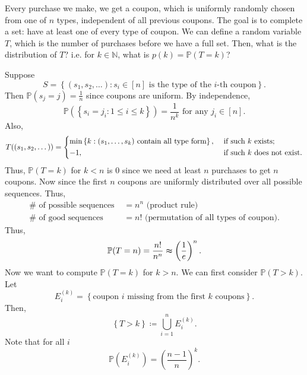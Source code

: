 \begin{eg}
    Every purchase we make, we get a coupon, which is uniformly randomly chosen from one of \(n\) types, independent of all previous coupons. The goal is to complete a set: have at least one of every type of coupon. We can define a random variable \(T\), which is the number of purchases before we have a full set. Then, what is the distribution of \(T\)? i.e. for \(k \in \mathbb{N} \), what is \(p(k) = \mathbb{P} (T = k)\)?    
\end{eg}

\begin{explanation}
    Suppose 
    \[
        S = \left\{ (s_1, s_2, \dots) : s_i \in [n] \text{ is the type of the } i\text{-th coupon}  \right\}. 
    \]
    Then \(\mathbb{P} (s_j = j) = \frac{1}{n}\) since coupons are uniform. By independence, 
    \[
        \mathbb{P} (\left\{ s_i = j_i : 1 \le i \le k \right\} ) = \frac{1}{n^k} \text{ for any } j_i \in [n]. 
    \] 
    Also,
    \[
        T((s_1, s_2, \dots )) = \begin{dcases}
            \min \left\{ k: (s_1, \dots , s_k) \text{ contain all type form}  \right\} , &\text{ if such } k \text{ exists};\\
            -1, &\text{ if such } k \text{ does not exist}.
        \end{dcases}
    \]
    Thus, \(\mathbb{P} (T = k)\) for \(k < n\) is \(0\) since we need at least \(n\) purchases to get \(n\) coupons. Now since the first \(n\) coupons are uniformly distributed over all possible sequences. Thus, 
    \begin{align*}
        \# \text{ of possible sequences } &= n^n \text{ (product rule)} \\
        \# \text{ of good sequences } &= n! \text{ (permutation of all types of coupon)}.  
    \end{align*}
    Thus, 
    \[
        \mathbb{P} (T = n) = \frac{n!}{n^n} \thickapprox \left( \frac{1}{e} \right)^n. 
    \] 
    Now we want to compute \(\mathbb{P} (T = k)\) for \(k > n\). We can first consider \(\mathbb{P} (T > k)\). Let 
    \[
        E_i^{(k)} = \left\{ \text{coupon } i \text{ missing from the first } k \text{ coupons}    \right\}. 
    \]  
    Then,
    \[
        \left\{ T > k \right\} \coloneqq \bigcup_{i=1}^{n} E_i^{(k)}.  
    \]
    Note that for all \(i\) 
    \[
        \mathbb{P} \left( E_i^{(k)} \right) = \left( \frac{n-1}{n} \right)^k.  
    \]
    \begin{question}

\end{question}
\end{explanation}
